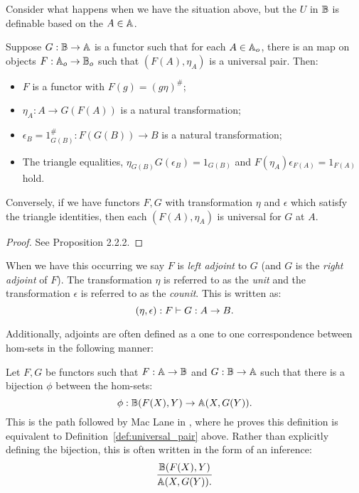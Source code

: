 Consider what happens when we have the situation above, but the $U$ in $\mathbb{B}$ is definable
based on the $A\in\mathbb{A}$.
\begin{lemma}\label{lem:adjoint-setup}
  Suppose $G:\mathbb{B}\to\mathbb{A}$ is a functor such that for each $A\in{\ensuremath{\mathbb{A}}}_o$, there is an map on objects
  $F:{\mathbb{A}}_o\to{\ensuremath{\mathbb{B}}}_o$ such that  $(F(A),\eta_A)$ is a universal pair. Then:
  \begin{itemize}
    \item $F$ is a functor with $F(g) = (g\eta)^{\#}$;
    \item $\eta_A: A \to G(F(A))$ is a natural transformation;
    \item $\epsilon_B = 1_{G(B)}^{\#}:F(G(B)) \to B$ is a natural transformation;
    \item The triangle equalities, $\eta_{G(B)}G(\epsilon_B) = 1_{G(B)}$ and $F(\eta_A)\epsilon_{F(A)} =
      1_{F(A)}$ hold.
  \end{itemize}
  Conversely, if we have functors $F,G$ with transformation $\eta$ and $\epsilon$ which satisfy the
  triangle identities, then each $(F(A),\eta_A)$ is universal for $G$ at $A$.
\end{lemma}
\begin{proof}
  See Proposition 2.2.2\cite{cockett2009:ctcs}.
\end{proof}

When we have this occurring we say $F$ is \emph{left adjoint} to $G$ (and $G$ is the
\emph{right adjoint} of $F$). The transformation $\eta$ is referred to as the \emph{unit} and the
transformation $\epsilon$ is referred to as the \emph{counit}. This is written as:
\[
  (\eta,\epsilon):F\vdash G:A\to B.
\]

Additionally, adjoints are often defined as a one to one correspondence between hom-sets in the
following manner:

Let $F,G$ be functors such that $F:\mathbb{A} \to \mathbb{B}$ and $G:\mathbb{B} \to \mathbb{A}$ such that there is a bijection $\phi$
between the hom-sets:
\[
  \phi: \mathbb{B}(F(X),Y) \to \mathbb{A}(X,G(Y)).
\]
This is the path followed by Mac Lane in \cite{maclan97:categorieswrkmath}, where he proves this
definition is equivalent to Definition~\ref{def:universal_pair} above. Rather than explicitly
defining the bijection, this is often written in the form of an inference:
\[
  \infer{\A(X,G(Y)).}{\B(F(X),Y)}
\]



